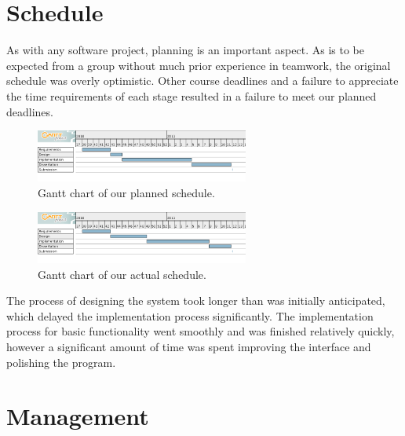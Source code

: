 \label{Organisation}

\section{Schedule}

As with any software project, planning is an important aspect. As is to be expected from a group without much prior experience in teamwork, the original schedule was overly optimistic. Other course deadlines and a failure to appreciate the time requirements of each stage resulted in a failure to meet our planned deadlines. 

\begin{figure}[!h]
    \begin{center}
        \includegraphics[width=7cm]{appendix/diagrams/GIMplan.png}
        \caption{Gantt chart of our planned schedule.}
        \label{lockingDia}
    \end{center}
\end{figure}

\begin{figure}[!h]
    \begin{center}
        \includegraphics[width=7cm]{appendix/diagrams/GIMreal.png}
        \caption{Gantt chart of our actual schedule.}
        \label{lockingDia}
    \end{center}
\end{figure}

The process of designing the system took longer than was initially anticipated, which delayed the implementation process significantly. The implementation process for basic functionality went smoothly and was finished relatively quickly, however a significant amount of time was spent improving the interface and polishing the program.

\section{Management}



